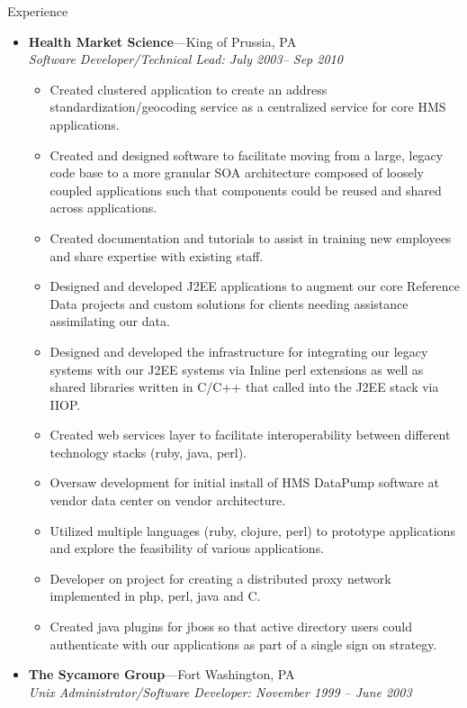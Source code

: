 \documentclass[11pt,oneside]{article}
\newenvironment{ressection}[1]{
        \vspace{4pt}
        {\fontfamily{phv}\selectfont\Large#1}
        \begin{itemize}
        \vspace{3pt}
}{
        \end{itemize}
}
\newcommand{\ressubitem}[1]{
        \vspace{-1pt}
        \item \begin{flushleft} #1 \end{flushleft}
}
\newcommand{\resbigitem}[3]{
        \vspace{-5pt}
        \item
        \textbf{#1}---#2 \\
        \textit{#3}
}
\newenvironment{ressubsec}[3]{
        \resbigitem{#1}{#2}{#3}
        \vspace{-2pt}
        \begin{itemize}
}{
        \end{itemize}
}
\begin{document}
\begin{ressection}{Experience}
\begin{ressubsec}{Health Market Science}{King of Prussia, PA}{Software Developer/Technical Lead: July 2003-- Sep 2010}
          \ressubitem{Created clustered application to create an
            address standardization/geocoding service as a centralized
            service for core HMS applications.}

          \ressubitem{Created and designed software to facilitate
            moving from a large, legacy code base to a more granular
            SOA architecture composed of loosely coupled applications
            such that components could be reused and shared across
            applications.}

          \ressubitem{Created documentation and tutorials to assist in
            training new employees and share expertise with existing
            staff.}

          \ressubitem{Designed and developed J2EE applications to
            augment our core Reference Data projects and custom
            solutions for clients needing assistance assimilating our
            data.}

          \ressubitem{Designed and developed the infrastructure for
            integrating our legacy systems with our J2EE systems via
            Inline perl extensions as well as shared libraries written
            in C/C++ that called into the J2EE stack via IIOP.}

          \ressubitem{Created web services layer to facilitate
            interoperability between different technology stacks
            (ruby, java, perl).}

          \ressubitem{Oversaw development for initial install of HMS
            DataPump software at vendor data center on vendor
            architecture.}

          \ressubitem{Utilized multiple languages (ruby, clojure,
            perl) to prototype applications and explore the
            feasibility of various applications.}

          \ressubitem{Developer on project for creating a distributed
            proxy network implemented in php, perl, java and C.}

          \ressubitem{Created java plugins for jboss so that active
            directory users could authenticate with our applications
            as part of a single sign on strategy.}

        \end{ressubsec}

        \begin{ressubsec}{The Sycamore Group}{Fort Washington, PA}{Unix Administrator/Software Developer: November 1999 -- June 2003}


\end{ressubsec}
\end{ressection}
\end{document}

